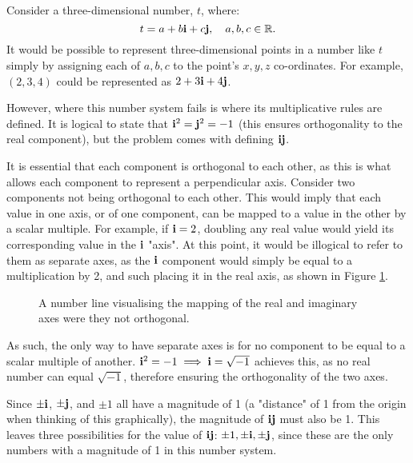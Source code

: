 \documentclass[10pt]{article}
\begin{document}
Consider a three-dimensional number, $t$, where:
\begin{equation}
    t = a + b\vb{i} + c\vb{j}, \quad a, b, c \in \mathbb{R}.
\end{equation}
It would be possible to represent three-dimensional points in a number like $t$ simply by assigning each of $a, b, c$ to the point's $x, y, z$ co-ordinates. For example, $\left(2, 3, 4\right)$ could be represented as $2 + 3\vb{i} + 4\vb{j}$.

However, where this number system fails is where its multiplicative rules are defined. It is logical to state that $\vb{i}^2 = \vb{j}^2 = -1$ (this ensures orthogonality to the real component), but the problem comes with defining $\vb{ij}$.

It is essential that each component is orthogonal to each other, as this is what allows each component to represent a perpendicular axis. Consider two components not being orthogonal to each other. This would imply that each value in one axis, or of one component, can be mapped to a value in the other by a scalar multiple. For example, if $\vb{i} = 2$, doubling any real value would yield its corresponding value in the $\vb{i}$ "axis". At this point, it would be illogical to refer to them as separate axes, as the $\vb{i}$ component would simply be equal to a multiplication by 2, and such placing it in the real axis, as shown in Figure \ref{RealLineFig}.

\begin{figure}[H]
    \centering
    \caption{A number line visualising the mapping of the real and imaginary axes were they not orthogonal.}
    \label{RealLineFig}
\end{figure}

As such, the only way to have separate axes is for no component to be equal to a scalar multiple of another. $\vb{i}^2 = -1 \implies \vb{i} = \sqrt{-1}$ achieves this, as no real number can equal $\sqrt{-1}$, therefore ensuring the orthogonality of the two axes.

Since $\pm\vb{i}$, $\pm\vb{j}$, and $\pm1$ all have a magnitude of 1 (a "distance" of 1 from the origin when thinking of this graphically), the magnitude of $\vb{ij}$ must also be 1. This leaves three possibilities for the value of $\vb{ij}$: $\pm1, \pm\vb{i}, \pm\vb{j}$, since these are the only numbers with a magnitude of 1 in this number system.
\end{document}
